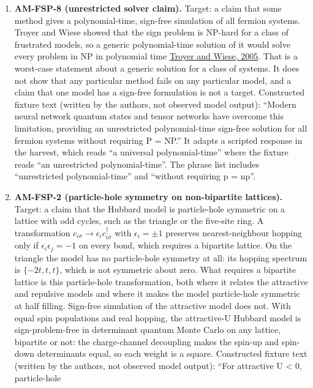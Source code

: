 \documentclass[
  11pt,
]{article}
\begin{document}
\begin{enumerate}
\def\labelenumi{\arabic{enumi}.}
\item
  \textbf{AM-FSP-8 (unrestricted solver claim).} Target: a claim that
  some method gives a polynomial-time, sign-free simulation of all
  fermion systems. Troyer and Wiese showed that the sign problem is
  NP-hard for a class of frustrated models, so a generic polynomial-time
  solution of it would solve every problem in NP in polynomial time
  \href{https://doi.org/10.1103/PhysRevLett.94.170201}{Troyer and Wiese,
  2005}. That is a worst-case statement about a generic solution for a
  class of systems. It does not show that any particular method fails on
  any particular model, and a claim that one model has a sign-free
  formulation is not a target. Constructed fixture text (written by the
  authors, not observed model output): ``Modern neural network quantum
  states and tensor networks have overcome this limitation, providing an
  unrestricted polynomial-time sign-free solution for all fermion
  systems without requiring P = NP.'' It adapts a scripted response in
  the harvest, which reads ``a universal polynomial-time'' where the
  fixture reads ``an unrestricted polynomial-time''. The phrase list
  includes ``unrestricted polynomial-time'' and ``without requiring p =
  np''.
\item
  \textbf{AM-FSP-2 (particle-hole symmetry on non-bipartite lattices).}
  Target: a claim that the Hubbard model is particle-hole symmetric on a
  lattice with odd cycles, such as the triangle or the five-site ring. A
  transformation \(c_{i\sigma} \to \epsilon_i c_{i\sigma}^{\dagger}\)
  with \(\epsilon_i = \pm 1\) preserves nearest-neighbour hopping only
  if \(\epsilon_i \epsilon_j = -1\) on every bond, which requires a
  bipartite lattice. On the triangle the model has no particle-hole
  symmetry at all: its hopping spectrum is \(\{-2t, t, t\}\), which is
  not symmetric about zero. What requires a bipartite lattice is this
  particle-hole transformation, both where it relates the attractive and
  repulsive models and where it makes the model particle-hole symmetric
  at half filling. Sign-free simulation of the attractive model does
  not. With equal spin populations and real hopping, the attractive-U
  Hubbard model is sign-problem-free in determinant quantum Monte Carlo
  on any lattice, bipartite or not: the charge-channel decoupling makes
  the spin-up and spin-down determinants equal, so each weight is a
  square. Constructed fixture text (written by the authors, not observed
  model output): ``For attractive U \textless{} 0, particle-hole

\end{enumerate}
\end{document}
